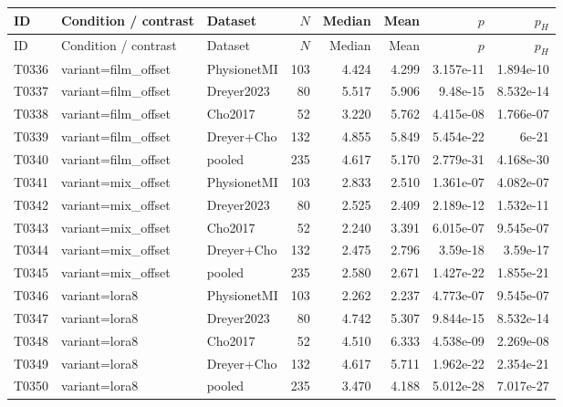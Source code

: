 \begin{longtable}{p{.45in}p{2.6in}p{.75in}rrrrr}
\toprule
ID & Condition / contrast & Dataset & $N$ & Median & Mean & $p$ & $p_H$ \\
\midrule
\endfirsthead
\toprule
ID & Condition / contrast & Dataset & $N$ & Median & Mean & $p$ & $p_H$ \\
\midrule
\endhead
T0336 & variant=film\_\allowbreak{}offset & PhysionetMI & 103 & 4.424 & 4.299 & 3.157e-11 & 1.894e-10 \\
T0337 & variant=film\_\allowbreak{}offset & Dreyer2023 & 80 & 5.517 & 5.906 & 9.48e-15 & 8.532e-14 \\
T0338 & variant=film\_\allowbreak{}offset & Cho2017 & 52 & 3.220 & 5.762 & 4.415e-08 & 1.766e-07 \\
T0339 & variant=film\_\allowbreak{}offset & Dreyer+Cho & 132 & 4.855 & 5.849 & 5.454e-22 & 6e-21 \\
T0340 & variant=film\_\allowbreak{}offset & pooled & 235 & 4.617 & 5.170 & 2.779e-31 & 4.168e-30 \\
T0341 & variant=mix\_\allowbreak{}offset & PhysionetMI & 103 & 2.833 & 2.510 & 1.361e-07 & 4.082e-07 \\
T0342 & variant=mix\_\allowbreak{}offset & Dreyer2023 & 80 & 2.525 & 2.409 & 2.189e-12 & 1.532e-11 \\
T0343 & variant=mix\_\allowbreak{}offset & Cho2017 & 52 & 2.240 & 3.391 & 6.015e-07 & 9.545e-07 \\
T0344 & variant=mix\_\allowbreak{}offset & Dreyer+Cho & 132 & 2.475 & 2.796 & 3.59e-18 & 3.59e-17 \\
T0345 & variant=mix\_\allowbreak{}offset & pooled & 235 & 2.580 & 2.671 & 1.427e-22 & 1.855e-21 \\
T0346 & variant=lora8 & PhysionetMI & 103 & 2.262 & 2.237 & 4.773e-07 & 9.545e-07 \\
T0347 & variant=lora8 & Dreyer2023 & 80 & 4.742 & 5.307 & 9.844e-15 & 8.532e-14 \\
T0348 & variant=lora8 & Cho2017 & 52 & 4.510 & 6.333 & 4.538e-09 & 2.269e-08 \\
T0349 & variant=lora8 & Dreyer+Cho & 132 & 4.617 & 5.711 & 1.962e-22 & 2.354e-21 \\
T0350 & variant=lora8 & pooled & 235 & 3.470 & 4.188 & 5.012e-28 & 7.017e-27 \\
\bottomrule
\end{longtable}

